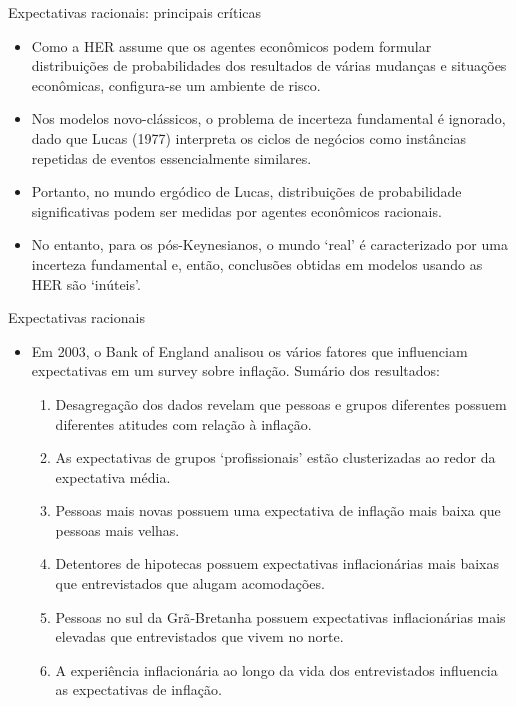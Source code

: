 \documentclass[10pt]{beamer}
\begin{document}
\begin{frame}{Expectativas racionais: principais críticas}
    \begin{itemize}
        \item Como a HER assume que os agentes econômicos podem formular distribuições de probabilidades dos resultados de várias mudanças e situações econômicas, configura-se um ambiente de risco.
        \bigskip
        \item Nos modelos novo-clássicos, o problema de incerteza fundamental é ignorado, dado que Lucas (1977) interpreta os ciclos de negócios como instâncias repetidas de eventos essencialmente similares.
        \bigskip
        \item Portanto, no mundo ergódico de Lucas, distribuições de probabilidade significativas podem ser medidas por agentes econômicos racionais.
        \bigskip
        \item No entanto, para os pós-Keynesianos, o mundo `real' é caracterizado por uma incerteza fundamental e, então, conclusões obtidas em modelos usando as HER são `inúteis'.
    \end{itemize}
\end{frame}

\begin{frame}{Expectativas racionais}
    \begin{itemize}
        \item Em 2003, o Bank of England analisou os vários fatores que influenciam expectativas em um survey sobre inflação. Sumário dos resultados:
        \begin{enumerate}
            \item Desagregação dos dados revelam que pessoas e grupos diferentes possuem diferentes atitudes com relação à inflação.
            \bigskip
            \item As expectativas de grupos `profissionais' estão clusterizadas ao redor da expectativa média.
            \bigskip
            \item Pessoas mais novas possuem uma expectativa de inflação mais baixa que pessoas mais velhas.
            \bigskip
            \item Detentores de hipotecas possuem expectativas inflacionárias mais baixas que entrevistados que alugam acomodações.
            \bigskip
            \item Pessoas no sul da Grã-Bretanha possuem expectativas inflacionárias mais elevadas que entrevistados que vivem no norte.
            \bigskip
            \item A experiência inflacionária ao longo da vida dos entrevistados influencia as expectativas de inflação.
        \end{enumerate}
    \end{itemize}
\end{frame}
\end{document}
